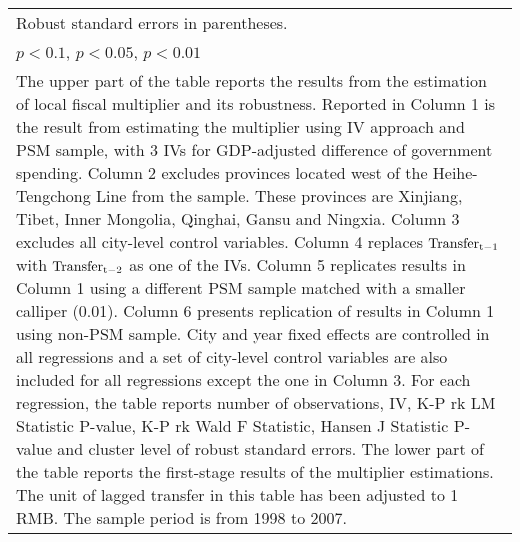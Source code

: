 \documentclass[11pt,a4paper]{article}
\begin{document}
\begin{landscape}
\begin{center}
\begin{scriptsize}
{\begin{tabular}{l*{6}{c}}
\multicolumn{7}{l}{\footnotesize Robust standard errors in parentheses. }\\
\multicolumn{7}{l}{\footnotesize \sym{*} \(p<0.1\), \sym{**} \(p<0.05\), \sym{***} \(p<0.01\)}\\
\multicolumn{7}{p{25cm}}{\footnotesize The upper part of the table reports the results from the estimation of local fiscal multiplier and its robustness. Reported in Column 1 is the result from estimating the multiplier using IV approach and PSM sample, with 3 IVs for GDP-adjusted difference of government spending. Column 2 excludes provinces located west of the Heihe-Tengchong Line from the sample. These provinces are Xinjiang, Tibet, Inner Mongolia, Qinghai, Gansu and Ningxia. Column 3 excludes all city-level control variables. Column 4 replaces $\rm Transfer_{t-1}$ with $\rm Transfer_{t-2}$ as one of the IVs. Column 5 replicates results in Column 1 using a different PSM sample matched with a smaller calliper (0.01). Column 6 presents replication of results in Column 1 using non-PSM sample. City and year fixed effects are controlled in all regressions and a set of city-level control variables are also included for all regressions except the one in Column 3. For each regression, the table reports number of observations, IV, K-P rk LM Statistic P-value, K-P rk Wald F Statistic, Hansen J Statistic P-value and cluster level of robust standard errors. The lower part of the table reports the first-stage results of the multiplier estimations. The unit of lagged transfer in this table has been adjusted to 1 RMB. The sample period is from 1998 to 2007. }\\
\end{tabular}
}

\end{scriptsize}
\end{center}
\end{landscape}


\newpage
\end{document}
